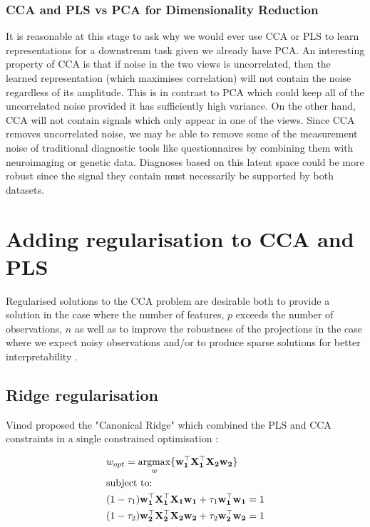 \subsubsection{CCA and PLS vs PCA for Dimensionality Reduction}

It is reasonable at this stage to ask why we would ever use CCA or PLS to learn representations for a downstream task given we already have PCA. An interesting property of CCA is that if noise in the two views is uncorrelated, then the learned representation (which maximises correlation) will not contain the noise regardless of its amplitude. This is in contrast to PCA which could keep all of the uncorrelated noise provided it has sufficiently high variance. On the other hand, CCA will not contain signals which only appear in one of the views. Since CCA removes uncorrelated noise, we may be able to remove some of the measurement noise of traditional diagnostic tools like questionnaires by combining them with neuroimaging or genetic data. Diagnoses based on this latent space could be more robust since the signal they contain must necessarily be supported by both datasets.

\section{Adding regularisation to CCA and PLS}

Regularised solutions to the CCA problem are desirable both to provide a solution in the case where the number of features, $p$ exceeds the number of observations, $n$ as well as to improve the robustness of the projections in the case where we expect noisy observations \cite{branco2005robust} and/or to produce sparse solutions for better interpretability \cite{parkhomenko2009sparse}.

\subsection{Ridge regularisation}\label{sec:Regularised CCA}

Vinod proposed the "Canonical Ridge" which combined the PLS and CCA constraints in a single constrained optimisation \cite{vinod1976canonical}:

\begin{align}
     & w_{opt}=\underset{w}{\mathrm{argmax}}\{\bold{w_1^{\top}X_1^{\top}X_2w_2}\}      \\
     & \text{subject to:} \notag                                                       \\
     & (1-\tau_1)\bold{w_1^{\top}X_1^{\top}X_1w_1}+\tau_1\bold{w_1^{\top}w_1}=1 \notag \\
     & (1-\tau_2)\bold{w_2^{\top}X_2^{\top}X_2w_2}+\tau_2\bold{w_2^{\top}w_2}=1 \notag
\end{align}

